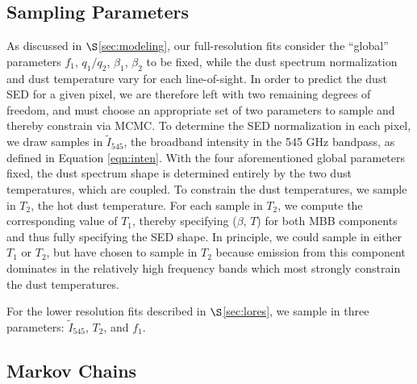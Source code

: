 \documentclass{emulateapj}
\begin{document}



\subsection{Sampling Parameters}
\label{sec:samp}
As discussed in $\S$\ref{sec:modeling}, our full-resolution fits
consider the ``global'' parameters $f_1$, $q_1/q_2$, $\beta_1$, $\beta_2$ to be
 fixed, while the dust spectrum normalization and dust temperature vary for
each line-of-sight. In order to predict the dust SED for a given pixel, we are 
therefore left with two remaining degrees of freedom, and must choose an 
appropriate set of two parameters to sample and thereby constrain via MCMC. To 
determine the SED normalization in each pixel, we draw samples in 
$\tilde{I}_{545}$, the broadband intensity in the 545 GHz bandpass, as defined 
in Equation \ref{eqn:inten}. With the four aforementioned global parameters 
fixed, the dust spectrum shape is determined entirely by the two dust 
temperatures, which are coupled. To constrain the dust temperatures,
 we sample in $T_2$, the hot dust temperature. For each sample in $T_2$, we 
compute the corresponding value of $T_1$, thereby specifying ($\beta$, $T$) for
both MBB components and thus fully specifying the SED shape. In principle,
we could sample in either $T_1$ or $T_2$, but have chosen to sample in $T_2$ 
because emission from this component dominates in the relatively high frequency
bands which most strongly constrain the dust temperatures.

For the lower resolution fits described in $\S$\ref{sec:lores}, we sample
in three parameters: $\tilde{I}_{545}$, $T_2$, and $f_1$.


\subsection{Markov Chains}
\label{sec:mcmc}
\end{document}
